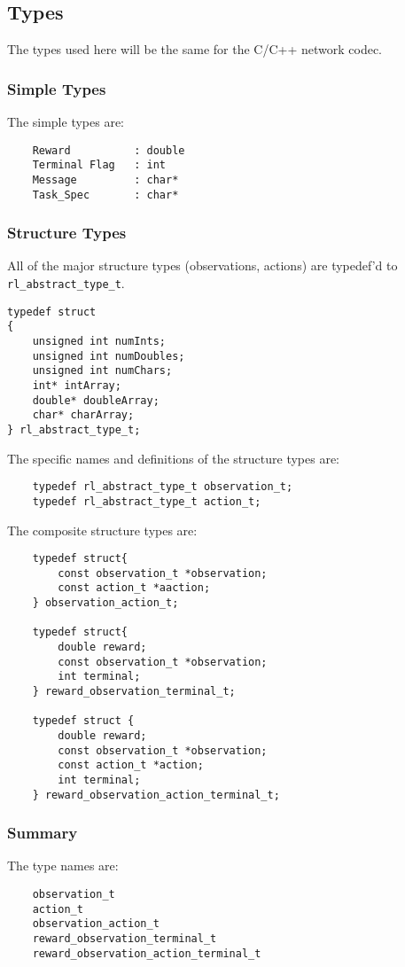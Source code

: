 \documentclass[11pt]{article}
\begin{document}
\subsection{Types}
The types used here will be the same for the C/C++ network codec.

\subsubsection{Simple Types}
The simple types are:

\begin{verbatim}
    Reward          : double
    Terminal Flag   : int
    Message         : char*
    Task_Spec       : char*
\end{verbatim}

\def\rat{rl\_abstract\_type\_t}

\subsubsection{Structure Types}
\label{sec:structure-types}
All of the major structure types (observations, actions) are typedef'd to \texttt{\rat}.

\begin{verbatim}
typedef struct
{
    unsigned int numInts;
    unsigned int numDoubles;
    unsigned int numChars;
    int* intArray;
    double* doubleArray;
    char* charArray;
} rl_abstract_type_t;
\end{verbatim}

The specific names and definitions of the structure types are:
\begin{verbatim}
    typedef rl_abstract_type_t observation_t;
    typedef rl_abstract_type_t action_t;
\end{verbatim}

The composite structure types are:
\begin{verbatim}
	typedef struct{
	    const observation_t *observation;
	    const action_t *aaction;
	} observation_action_t;

	typedef struct{
	    double reward;
	    const observation_t *observation;
	    int terminal;
	} reward_observation_terminal_t;

	typedef struct {
	    double reward;
	    const observation_t *observation;
	    const action_t *action;
	    int terminal;
	} reward_observation_action_terminal_t;
\end{verbatim}

\subsubsection{Summary}
The type names are:
\begin{verbatim}
    observation_t
    action_t
    observation_action_t
    reward_observation_terminal_t
    reward_observation_action_terminal_t
\end{verbatim}
\end{document}
